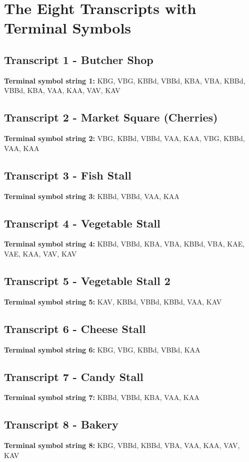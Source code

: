 \documentclass[12pt,a4paper]{article}
\begin{document}
\newpage
\appendix
\section{The Eight Transcripts with Terminal Symbols}

\subsection{Transcript 1 - Butcher Shop}
\textbf{Terminal symbol string 1:} KBG, VBG, KBBd, VBBd, KBA, VBA, KBBd, VBBd, KBA, VAA, KAA, VAV, KAV

\subsection{Transcript 2 - Market Square (Cherries)}
\textbf{Terminal symbol string 2:} VBG, KBBd, VBBd, VAA, KAA, VBG, KBBd, VAA, KAA

\subsection{Transcript 3 - Fish Stall}
\textbf{Terminal symbol string 3:} KBBd, VBBd, VAA, KAA

\subsection{Transcript 4 - Vegetable Stall}
\textbf{Terminal symbol string 4:} KBBd, VBBd, KBA, VBA, KBBd, VBA, KAE, VAE, KAA, VAV, KAV

\subsection{Transcript 5 - Vegetable Stall 2}
\textbf{Terminal symbol string 5:} KAV, KBBd, VBBd, KBBd, VAA, KAV

\subsection{Transcript 6 - Cheese Stall}
\textbf{Terminal symbol string 6:} KBG, VBG, KBBd, VBBd, KAA

\subsection{Transcript 7 - Candy Stall}
\textbf{Terminal symbol string 7:} KBBd, VBBd, KBA, VAA, KAA

\subsection{Transcript 8 - Bakery}
\textbf{Terminal symbol string 8:} KBG, VBBd, KBBd, VBA, VAA, KAA, VAV, KAV
\end{document}
